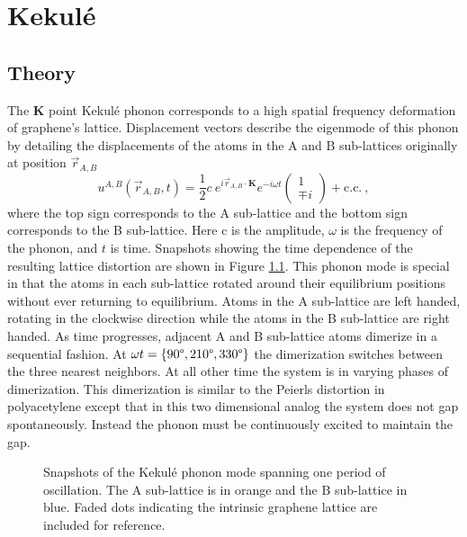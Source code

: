 \chapter{Kekul\'e \label{chap:kek}}

\section{Theory}
The $\bm{K}$ point Kekul\'e phonon corresponds to a high spatial frequency deformation of graphene's lattice.
Displacement vectors describe the eigenmode of this phonon by detailing the displacements of the atoms in the A and B sub-lattices originally at position $\vec{r}_{A,B}$
\begin{equation}
	u^{A,B}(\vec{r}_{A,B},t)=\frac{1}{2} c \ e^{i \vec{r}_{A,B} \cdot \bm{K}} e^{-i \omega t} 
		\left( \begin{array}{c}
			1 \\
			\mp i
		\end{array} \right)
	 + \text{c.c.} \label{eq:kek:displacements} \ ,
\end{equation}
where the top sign corresponds to the A sub-lattice and the bottom sign corresponds to the B sub-lattice.
Here c is the amplitude, $\omega$ is the frequency of the phonon, and $t$ is time.
Snapshots showing the time dependence of the resulting lattice distortion are shown in Figure \ref{fig:kek:snapshots}.
This phonon mode is special in that the atoms in each sub-lattice rotated around their equilibrium positions without ever returning to equilibrium.
Atoms in the A sub-lattice are left handed, rotating in the clockwise direction while the atoms in the B sub-lattice are right handed.
As time progresses, adjacent A and B sub-lattice atoms dimerize in a sequential fashion.
At $\omega t=\{90 \text{\textdegree}, 210 \text{\textdegree}, 330 \text{\textdegree} \}$ the dimerization switches between the three nearest neighbors.
At all other time the system is in varying phases of dimerization.
This dimerization is similar to the Peierls distortion in polyacetylene except that in this two dimensional analog the system does not gap spontaneously.
Instead the phonon must be continuously excited to maintain the gap.

\begin{figure}
	\begin{center}
	
	\end{center}
	\caption[Snapshots of the Kekul\'e phonon mode]{\label{fig:kek:snapshots}
		Snapshots of the Kekul\'e phonon mode spanning one period of oscillation.
		The A sub-lattice is in orange and the B sub-lattice in blue.
		Faded dots indicating the intrinsic graphene lattice are included for reference.}
\end{figure}

